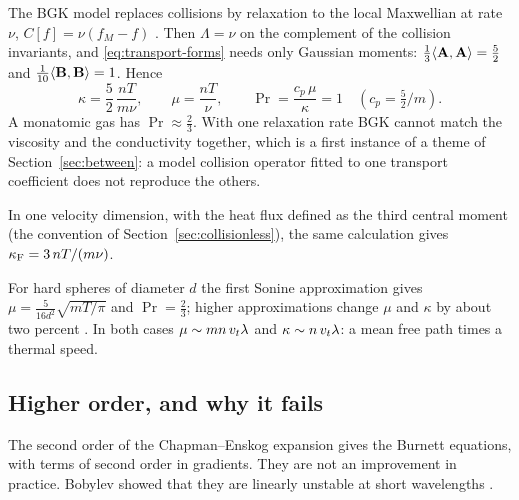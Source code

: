 \begin{example}[BGK]
\label{ex:bgk}
The BGK model replaces collisions by relaxation to the local Maxwellian at
rate $\nu$, $C[f]=\nu(f_M-f)$ \cite{BGK54}. Then $\Lambda=\nu$ on the
complement of the collision invariants, and \eqref{eq:transport-forms}
needs only Gaussian moments:
$\tfrac13\langle \mathbf A,\mathbf A \rangle=\tfrac52$ and
$\tfrac1{10}\langle \mathbf B,\mathbf B \rangle=1$. Hence
\begin{equation}
  \kappa=\frac52\,\frac{nT}{m\nu},\qquad \mu=\frac{nT}{\nu},\qquad
  \Pr=\frac{c_p\,\mu}{\kappa}=1 \quad(c_p=\tfrac52/m).
\end{equation}
A monatomic gas has $\Pr\approx\tfrac23$. With one relaxation rate BGK
cannot match the viscosity and the conductivity together, which is a first
instance of a theme of Section~\ref{sec:between}: a model collision
operator fitted to one transport coefficient does not reproduce the others.

In one velocity dimension, with the heat flux defined as the third central
moment (the convention of Section~\ref{sec:collisionless}), the same
calculation gives $\kappa_{\mathrm F}=3\,nT/(m\nu)$.
\end{example}

For hard spheres of diameter $d$ the first Sonine approximation gives
$\mu=\tfrac{5}{16d^2}\sqrt{mT/\pi}$ and $\Pr=\tfrac23$; higher
approximations change $\mu$ and $\kappa$ by about two percent
\cite{ChapmanCowling}. In both cases
$\mu\sim mn\,v_t\lambda$ and $\kappa\sim n\,v_t\lambda$: a mean free path
times a thermal speed.

\subsection{Higher order, and why it fails}
\label{sec:burnett}

The second order of the Chapman--Enskog expansion gives the Burnett
equations, with terms of second order in gradients. They are not an
improvement in practice. Bobylev showed that they are linearly unstable at
short wavelengths \cite{Bobylev82}.

